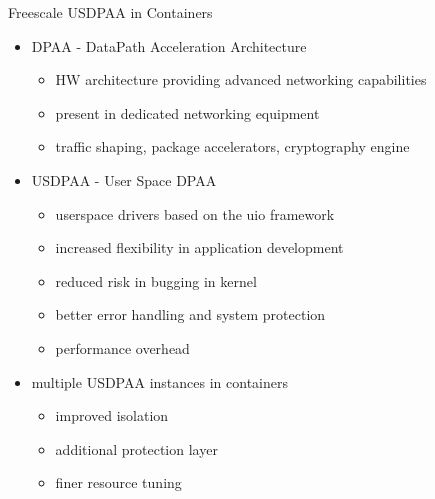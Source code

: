 \begin{frame}{Freescale USDPAA in Containers}
	\begin{itemize}
	\item DPAA - DataPath Acceleration Architecture
		\begin{itemize}
		\item HW architecture providing advanced networking capabilities
		\item present in dedicated networking equipment
		\item traffic shaping, package accelerators, cryptography engine
		\end{itemize}
	\item USDPAA - User Space DPAA
		\begin{itemize}
		\item userspace drivers based on the uio framework
		\item increased flexibility in application development
		\item reduced risk in bugging in kernel
		\item better error handling and system protection
		\item performance overhead
		\end{itemize}
	\item multiple USDPAA instances in containers
		\begin{itemize}
		\item improved isolation
		\item additional protection layer
		\item finer resource tuning
		\end{itemize}
	\end{itemize}
\end{frame}